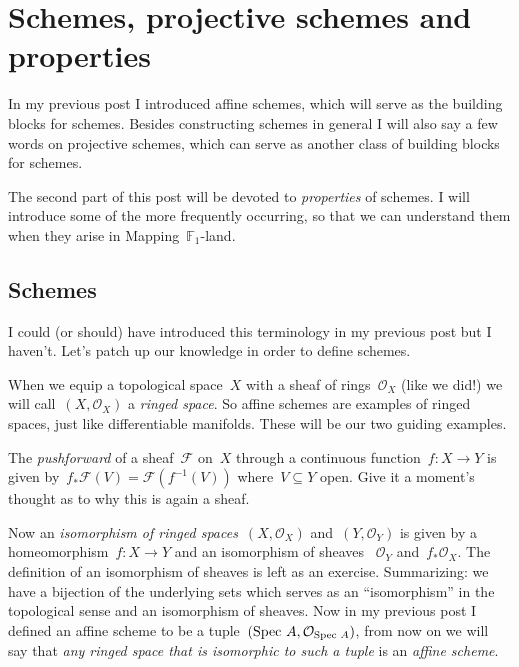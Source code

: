 \section{Schemes, projective schemes and properties}

In my previous post I introduced affine schemes, which will serve as the building blocks for schemes. Besides constructing schemes in general I will also say a few words on projective schemes, which can serve as another class of building blocks for schemes.

The second part of this post will be devoted to \emph{properties} of schemes. I will introduce some of the more frequently occurring, so that we can understand them when they arise in \iftex\cite{mapping-fun}\fi\ifblog Mapping~$\mathbb{F}_1$-land\fi.

\subsection{Schemes}
I could (or should) have introduced this terminology in my previous post but I haven't. Let's patch up our knowledge in order to define schemes.

\begin{definition}
  When we equip a topological space~$X$ with a sheaf of rings~$\mathcal{O}_X$ (like we did!) we will call~$(X,\mathcal{O}_X)$ a \emph{ringed space}. So affine schemes are examples of ringed spaces, just like differentiable manifolds. These will be our two guiding examples.
\end{definition}

\begin{definition}
  The \emph{pushforward} of a sheaf~$\mathcal{F}$ on~$X$ through a continuous function~$f\colon X\to Y$ is given by~$f_\ast\mathcal{F}(V)=\mathcal{F}(f^{-1}(V))$ where~$V\subseteq Y$ open. Give it a moment's thought as to why this is again a sheaf.
\end{definition}

\begin{definition}
  Now an \emph{isomorphism of ringed spaces}~$(X,\mathcal{O}_X)$ and~$(Y,\mathcal{O}_Y)$ is given by a homeomorphism~$f\colon X\to Y$ and an isomorphism of sheaves ~$\mathcal{O}_Y$ and~$f_\ast\mathcal{O}_X$. The definition of an isomorphism of sheaves is left as an exercise. Summarizing: we have a bijection of the underlying sets which serves as an ``isomorphism'' in the topological sense and an isomorphism of sheaves. Now in my previous post I defined an affine scheme to be a tuple~$(\operatorname{Spec\,} A,\mathcal{O}_{\operatorname{Spec\,} A})$, from now on we will say that \emph{any ringed space that is isomorphic to such a tuple} is an \emph{affine scheme}.
\end{definition}

